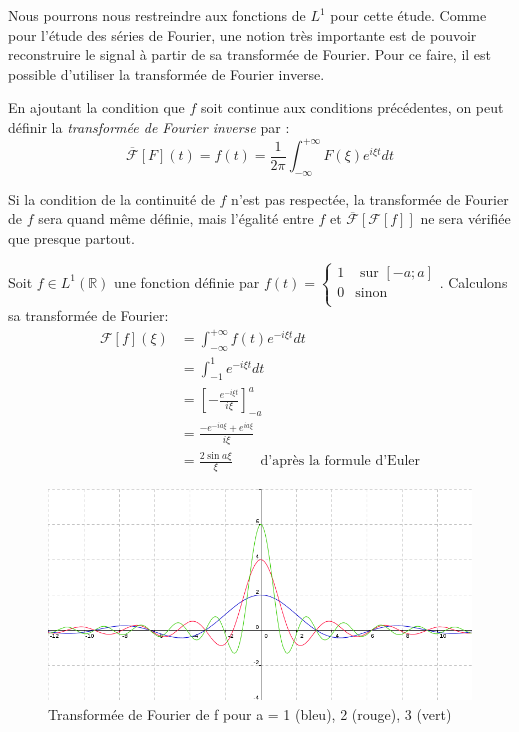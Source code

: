 	Nous pourrons nous restreindre aux fonctions de $L^1$ pour cette étude. 
	Comme pour l'étude des séries de Fourier, une notion très importante est de pouvoir reconstruire le signal à partir de sa transformée de Fourier. Pour ce faire, il est possible d'utiliser la transformée de Fourier inverse. 

	\begin{mydef}
		En ajoutant la condition que $f$ soit continue aux conditions précédentes, on peut définir la \textit{transformée de Fourier inverse} par :
		$$ \overline{\mathcal{F}}[F](t) = f(t)=\frac{1}{{2\pi}} \int_{-\infty}^{+\infty}F(\xi)e^{i \xi t}dt $$ 
	\end{mydef}
	
	\begin{myrem}
		Si la condition de la continuité de $f$ n'est pas respectée, la transformée de Fourier de $f$ sera quand même définie, mais l'égalité entre $f$ et $\overline{\mathcal{F}}[\mathcal{F}[f]]$ ne sera vérifiée que presque partout. 
	\end{myrem}
			
	\begin{myexmpl}
		Soit $f \in L^1(\mathbb{R})$ une fonction définie par 	
		$ f(t) = \left\{
		\begin{array}{cc}
		1 & \text{ sur }[-a; a] \\
		0 & \text{sinon} \\
		\end{array}
		\right. $.
		Calculons sa transformée de Fourier: 
		\begin{align*}
			\mathcal{F}[f](\xi)& = \int_{- \infty}^{+\infty} f(t)e^{-i\xi t}dt \\
							   & = \int_{-1}^{1} e^{-i\xi t}dt \\
							   & =  \left[ -\frac{e^{-i\xi t}}{i \xi} \right]_{-a}^{a} \\
							   & =  \frac{-e^{-ia\xi} + e^{ia \xi}} {i \xi} \\
							   & = \frac {2 \sin{a\xi}}{\xi} \qquad \text{d'après la formule d'Euler}
		\end{align*}
		
			\begin{figure}[h]
				\centering
				\includegraphics[width=350pt]{Chloe/TF123.png}
				\caption{Transformée de Fourier de f pour a = 1 (bleu), 2 (rouge), 3 (vert) }
			\end{figure}
	\end{myexmpl}
	
